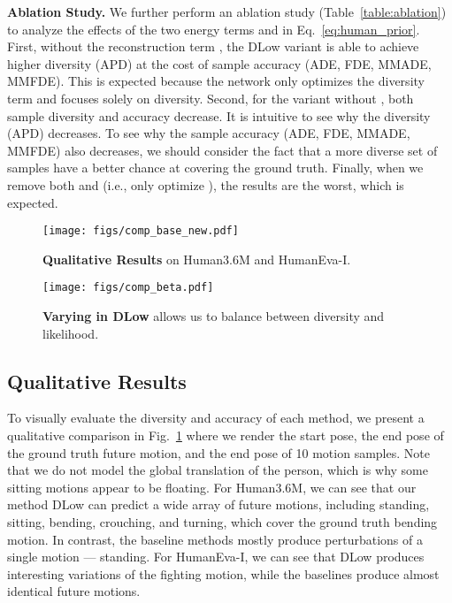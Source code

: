 \documentclass[runningheads]{llncs}
\begin{document}
	\vspace{1mm}
	\noindent\textbf{Ablation Study.}
	We further perform an ablation study (Table~\ref{table:ablation}) to analyze the effects of the two energy terms  and  in Eq.~\eqref{eq:human_prior}. First, without the reconstruction term , the DLow variant is able to achieve higher diversity (APD) at the cost of sample accuracy (ADE, FDE, MMADE, MMFDE). This is expected because the network only optimizes the diversity term  and focuses solely on diversity. Second, for the variant without , both sample diversity and accuracy decrease. It is intuitive to see why the diversity (APD) decreases. To see why the sample accuracy (ADE, FDE, MMADE, MMFDE) also decreases, we should consider the fact that a more diverse set of samples have a better chance at covering the ground truth. Finally, when we remove both  and  (i.e., only optimize ), the results are the worst, which is expected.
	
	\begin{figure}[t]
		\centering
		\texttt{[image: figs/comp\_base\_new.pdf]}
		\vspace{-7mm}
		\caption{\textbf{Qualitative Results} on Human3.6M and HumanEva-I.}
		\label{fig:comp_base}
		\vspace{-3mm}
	\end{figure}
	
	
	\begin{figure}[t]
		\centering
		\texttt{[image: figs/comp\_beta.pdf]}
		\vspace{-7mm}
		\caption{\textbf{Varying  in DLow} allows us to balance between diversity and likelihood. }
		\label{fig:beta}
		\vspace{-5mm}
	\end{figure}
	
	
	\vspace{-3mm}
	\subsection{Qualitative Results}
	\vspace{-1mm}
	To visually evaluate the diversity and accuracy of each method, we present a qualitative comparison in Fig.~\ref{fig:comp_base} where we render the start pose, the end pose of the ground truth future motion, and the end pose of 10 motion samples. Note that we do not model the global translation of the person, which is why some sitting motions appear to be floating. For Human3.6M, we can see that our method DLow can predict a wide array of future motions, including standing, sitting, bending, crouching, and turning, which cover the ground truth bending motion. In contrast, the baseline methods mostly produce perturbations of a single motion --- standing. For HumanEva-I, we can see that DLow produces interesting variations of the fighting motion, while the baselines produce almost identical future motions.
	
\end{document}
